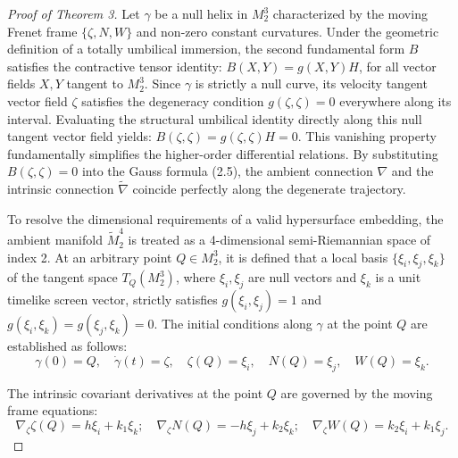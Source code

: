 \documentclass[10pt,a4paper]{amsart}
\begin{document}
\begin{proof}[Proof of Theorem 3]
Let $\gamma$ be a null helix in $M_2^3$ characterized by the moving Frenet frame $\{\zeta,N,W\}$ and non-zero constant curvatures. Under the geometric definition of a totally umbilical immersion, the second fundamental form $B$ satisfies the contractive tensor identity: $B(X,Y)=g(X,Y)H$, for all vector fields $X,Y$ tangent to $M_2^3$. Since $\gamma$ is strictly a null curve, its velocity tangent vector field $\zeta$ satisfies the degeneracy condition $g(\zeta,\zeta) = 0$ everywhere along its interval. Evaluating the structural umbilical identity directly along this null tangent vector field yields: $B(\zeta,\zeta)=g(\zeta,\zeta)H= 0$. This vanishing property fundamentally simplifies the higher-order differential relations. By substituting $B(\zeta,\zeta)= 0$ into the Gauss formula (2.5), the ambient connection $\nabla$ and the intrinsic connection $\tilde{\nabla}$ coincide perfectly along the degenerate trajectory.

To resolve the dimensional requirements of a valid hypersurface embedding, the ambient manifold $\tilde{M}_2^4$ is treated as a 4-dimensional semi-Riemannian space of index 2. At an arbitrary point $Q \in M_2^3$, it is defined that a local basis $\{\xi_i,\xi_j,\xi_k\}$ of the tangent space $T_Q(M_2^3)$, where $\xi_i, \xi_j$ are null vectors and $\xi_k$ is a unit timelike screen vector, strictly satisfies $g(\xi_i,\xi_j)=1$ and $g(\xi_i,\xi_k)=g(\xi_j,\xi_k)=0$. The initial conditions along $\gamma$ at the point $Q$ are established as follows:
\begin{equation}
\gamma(0)=Q, \quad \dot{\gamma}(t)=\zeta, \quad \zeta(Q)=\xi_i, \quad N(Q)=\xi_j, \quad W(Q)=\xi_k.
\end{equation}

The intrinsic covariant derivatives at the point $Q$ are governed by the moving frame equations:
\begin{equation}
\nabla_\zeta \zeta(Q)=h\xi_i+k_1 \xi_k; \quad \nabla_\zeta N(Q)=-h\xi_j+k_2 \xi_k; \quad \nabla_\zeta W(Q)=k_2 \xi_i+k_1 \xi_j.
\end{equation}


\end{proof}
\end{document}
